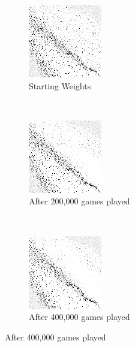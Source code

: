 
\begin{figure}
\center

	\begin{subfigure}[t]{0.3\textwidth}
	\centering
	\includegraphics[width=\stratgraphwidth]{images/findings/round2/flipbook/winner/checkpoint_000000.png}
	\caption{Starting Weights}
	\end{subfigure}
	~
	\begin{subfigure}[t]{0.3\textwidth}
	\centering
	\includegraphics[width=\stratgraphwidth]{images/findings/round2/flipbook/winner/checkpoint_200000.png}
	\caption{After 200,000 games played}
	\end{subfigure}
	~
	\begin{subfigure}[t]{0.3\textwidth}
	\centering
	\includegraphics[width=\stratgraphwidth]{images/findings/round2/flipbook/winner/checkpoint_400000.png}
	\caption{After 400,000 games played}
	\end{subfigure}


\end{figure}
